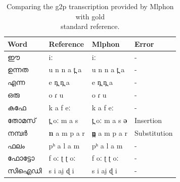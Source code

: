 \documentclass{ieeeaccess}
\begin{document}
\begin{table}[h]
	\begin{center}
		\begin{minipage}{\textwidth}
			\caption{Comparing the g2p transcription provided by  Mlphon with gold \\ standard reference.}
			\label{gold}
			\begin{tabular}{@{}p{1.7cm}p{1.5cm}p{1.5cm}p{1.5cm}@{}}
				\hline\hline
			 Word             & Reference             & Mlphon                   & Error        \\
				\hline
				{\mal ഈ}         & {\ipa iː}                               & {\ipa iː}                               & -            \\
				 {\mal ഉന്നത}      & {\ipa u n n a t̪ a}                      & {\ipa u n n a t̪ a}                      & -            \\
			 {\mal  എന്ന}       & {\ipa e n̪ n̪ a }                         & {\ipa e n̪ n̪ a}                          & -            \\
			 {\mal  ഒരു}        & {\ipa o ɾ u }                           & {\ipa o ɾ u}                            & -            \\
			 {\mal കഫേ}       & {\ipa k a f eː}                         & {\ipa k a f eː}                         & -            \\
			{\mal തോമസ്}      & {\ipa t̪ oː m a s}    &            {\ipa t̪ oː m a s} \textbf{{\ipa  ə}}            & Insertion    \\
			 {\mal നമ്പർ}      & {\ipa \textbf{n} a m p a r}            & \textbf{{\ipa n̪  }} {\ipa  a m p a r}             & Substitution \\
			 {\mal ഫലം}       & {\ipa  pʰ a l a m}                      & {\ipa pʰ a l a m}                       & -            \\
			 {\mal ഫോട്ടോ}     & {\ipa f oː ʈ ʈ oː}                      & {\ipa f oː ʈ ʈ oː}                      & -            \\
			  {\mal സിഐഡി}     & {\ipa s i ai̯ ɖ i }                      & {\ipa s i ai̯ ɖ i }                      & -            \\
				\hline
			\end{tabular}
		\end{minipage}
	\end{center}
\end{table}
\end{document}
